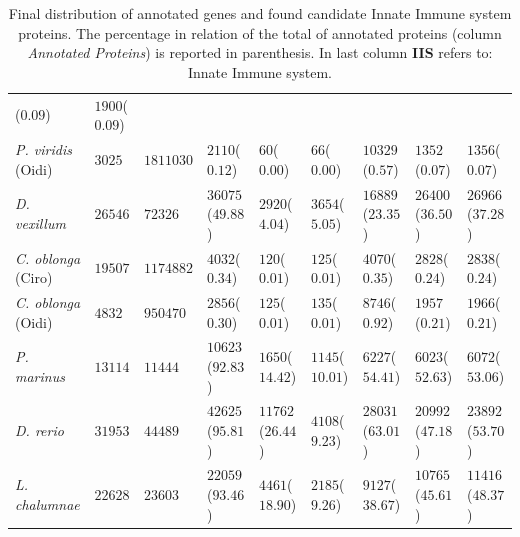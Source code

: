 \documentclass[11pt]{article}
\begin{document}
\begin{table}
\begin{tabular}{p{3.2cm}p{2cm}p{2cm}p{2cm}p{2cm}p{2cm}p{2.1cm}p{2.7cm}p{2.6cm}}
($0.09$)&$1900$($0.09$)\\
\textsl{P. viridis} (Oidi)&     
$3025$&$1811030$&$2110$($0.12$)&$60$($0.00$)&$66$($0.00$)&$10329$($0.57$)&$1352$
($0.07$)&$1356$($0.07$)\\
\textsl{D. vexillum}&   
$26546$&$72326$&$36075$($49.88$)&$2920$($4.04$)&$3654$($5.05$)&$16889$($23.35$)&
$26400$($36.50$)&$26966$($37.28$)\\
\textsl{C. oblonga} (Ciro)&     
$19507$&$1174882$&$4032$($0.34$)&$120$($0.01$)&$125$($0.01$)&$4070$($0.35$)&$282
8$($0.24$)&$2838$($0.24$)\\
\textsl{C. oblonga} (Oidi)&     
$4832$&$950470$&$2856$($0.30$)&$125$($0.01$)&$135$($0.01$)&$8746$($0.92$)&$1957$
($0.21$)&$1966$($0.21$)\\
\midrule 
\textsl{P. marinus}&    
$13114$&$11444$&$10623$($92.83$)&$1650$($14.42$)&$1145$($10.01$)&$6227$($54.41$)
&$6023$($52.63$)&$6072$($53.06$)\\
\textsl{D. rerio}&      
$31953$&$44489$&$42625$($95.81$)&$11762$($26.44$)&$4108$($9.23$)&$28031$($63.01$
)&$20992$($47.18$)&$23892$($53.70$)\\
\textsl{L. chalumnae}&  
$22628$&$23603$&$22059$($93.46$)&$4461$($18.90$)&$2185$($9.26$)&$9127$($38.67$)&
$10765$($45.61$)&$11416$($48.37$)\\
\bottomrule
\end{tabular}
\caption{Final distribution of annotated genes and found candidate Innate 
Immune system proteins. The percentage in relation of the total of annotated  
proteins (column \textit{Annotated Proteins}) is reported in parenthesis. In 
last column \textbf{IIS} refers to: Innate Immune system.}
\label{table:distribution_prot}
\end{table}
\end{document}
